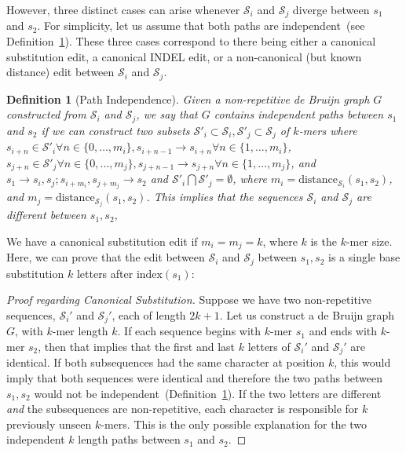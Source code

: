\documentclass{bioinfo}
\newtheorem{defn}{Definition}
\begin{document}
\begin{methods}
However, three distinct cases can arise whenever $\mathcal{S}_i$ and $\mathcal{S}_j$ diverge between
$s_1$ and $s_2$. For simplicity, let us assume that both paths are independent~(see
Definition~\ref{defn:path-independence}). These three cases correspond to there being either a canonical
substitution edit, a canonical INDEL edit, or a non-canonical (but known distance) edit between
$\mathcal{S}_i$ and $\mathcal{S}_j$.

\begin{defn}[Path Independence]
\label{defn:path-independence}
Given a non-repetitive de Bruijn graph $G$ constructed from $\mathcal{S}_i$ and $\mathcal{S}_j$, we say
that $G$ contains independent paths between $s_1$ and $s_2$ if we can construct two subsets
$\mathcal{S}'_i \subset \mathcal{S}_i, \mathcal{S}'_j \subset \mathcal{S}_j$ of $k$-mers where $s_{i + n}
\in \mathcal{S}'_i \forall n \in \{0, \dots, m_i\}, s_{i + n - 1} \rightarrow s_{i + n} \forall n \in \{1, \dots, m_i\}$,
$s_{j + n} \in \mathcal{S}'_j \forall n \in \{0, \dots, m_j\}, s_{j + n - 1} \rightarrow s_{j + n} \forall n \in \{1,
\dots, m_j\}$, and $s_1 \rightarrow s_i, s_j; s_{i + m_i}, s_{j + m_j} \rightarrow s_2$ and $\mathcal{S}'_i
\bigcap \mathcal{S}'_j = \emptyset$, where $m_i = \text{distance}_{\mathcal{S}_i}(s_1, s_2)$, and $m_j =
\text{distance}_{\mathcal{S}_j}(s_1, s_2)$. This implies that the sequences $\mathcal{S}_i$ and
$\mathcal{S}_j$ are different between $s_1, s_2$,
\end{defn}

We have a canonical substitution edit if $m_i = m_j = k$, where $k$ is the $k$-mer size. Here, we can
prove that the edit between $\mathcal{S}_i$ and $\mathcal{S}_j$ between $s_1, s_2$ is a single base
substitution $k$ letters after $\text{index}(s_1)$:

\begin{proof}[Proof regarding Canonical Substitution]
\label{proof:canonical-substitution}
Suppose we have two non-repetitive sequences, $\mathcal{S}_i'$ and $\mathcal{S}_j'$, each of length
$2k + 1$. Let us construct a de Bruijn graph $G$, with $k$-mer length $k$. If each sequence begins with
$k$-mer $s_1$ and ends with $k$-mer $s_2$, then that implies that the first and last $k$ letters of
$\mathcal{S}_i'$ and $\mathcal{S}_j'$ are identical. If both subsequences had the same character at
position $k$, this would imply that both sequences were identical and therefore the two paths between
$s_1, s_2$ would not be independent~(Definition~\ref{defn:path-independence}). If the two letters are
different \emph{and} the subsequences are non-repetitive, each character is responsible for $k$
previously unseen $k$-mers. This is the only possible explanation for the two independent $k$ length
paths between $s_1$ and $s_2$.
\end{proof}


\end{methods}
\end{document}
